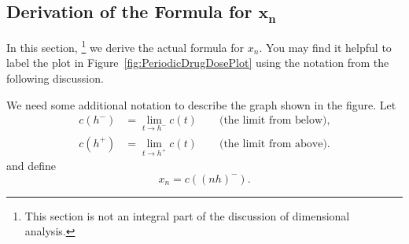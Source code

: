 \documentclass[reqno]{immbook}
\numberwithin{equation}{chapter}
\numberwithin{question}{section}
\numberwithin{theorem}{chapter}
\numberwithin{figure}{chapter}
\theoremstyle{definition}
\begin{document}
\subsection*{Derivation of the Formula for $\pmb{x_{n}}$}%
In this section,%
\footnote{This section is not an integral part of the
discussion of dimensional analysis.}
we derive the actual formula for
$x_n$. 
You may find it helpful to label the plot in
Figure~\ref{fig:PeriodicDrugDosePlot} using the notation
from the following discussion.

We need some additional notation to describe the
graph shown in the figure.
Let
\begin{equation}
\begin{split}
    c(h^{-})  & = \lim_{t\rightarrow h^{-}} c(t)
                     \quad\quad \textrm{(the limit from below),} \\
    c(h^{+})  & = \lim_{t\rightarrow h^{+}} c(t)
                     \quad\quad \textrm{(the limit from above).}
\end{split}
\end{equation}
and define
\begin{equation}
   x_n = c((nh)^{-}).
\end{equation}
\end{document}
